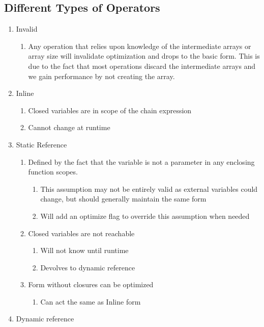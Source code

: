 \subsection{Different Types of Operators}
\begin{enumerate}
  \item Invalid
    \begin{enumerate}
      \item Any operation that relies upon knowledge of the intermediate arrays or array size will invalidate optimization and drops to the basic form.  This is due to the fact that most operations discard the intermediate arrays and we gain performance by not creating the array.
    \end{enumerate}
  \item Inline
    \begin{enumerate}
      \item Closed variables are in scope of the chain expression
      \item Cannot change at runtime
    \end{enumerate}
  \item Static Reference
    \begin{enumerate}
      \item Defined by the fact that the variable is not a parameter in any enclosing function scopes.
        \begin{enumerate}
          \item This assumption may not be entirely valid as external variables could change, but should generally maintain the same form
          \item  Will add an optimize flag to override this assumption when needed
        \end{enumerate}
      \item Closed variables are not reachable
        \begin{enumerate}
          \item Will not know until runtime
          \item Devolves to dynamic reference
        \end{enumerate}
      \item Form without closures can be optimized
        \begin{enumerate}
          \item Can act the same as Inline form
        \end{enumerate}
    \end{enumerate}
  \item Dynamic reference

\end{enumerate}
